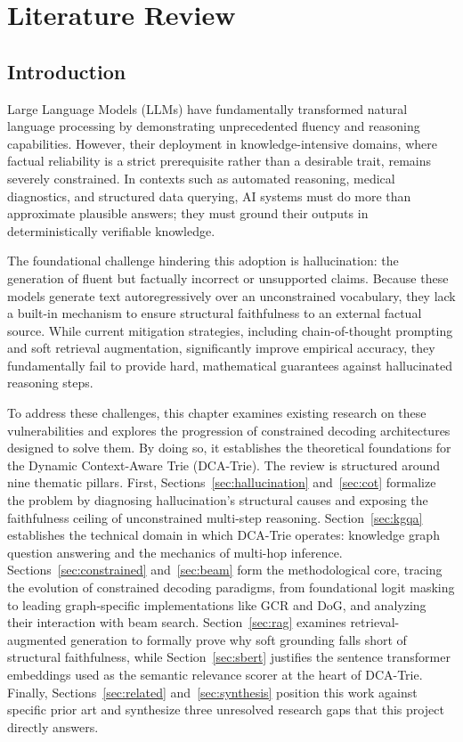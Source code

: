 
\chapter{Literature Review}
\section{Introduction}

Large Language Models (LLMs) have fundamentally transformed natural language processing by demonstrating unprecedented fluency and reasoning capabilities. However, their deployment in knowledge-intensive domains, where factual reliability is a strict prerequisite rather than a desirable trait, remains severely constrained. In contexts such as automated reasoning, medical diagnostics, and structured data querying, AI systems must do more than approximate plausible answers; they must ground their outputs in deterministically verifiable knowledge.

The foundational challenge hindering this adoption is hallucination: the generation of fluent but factually incorrect or unsupported claims. Because these models generate text autoregressively over an unconstrained vocabulary, they lack a built-in mechanism to ensure structural faithfulness to an external factual source. While current mitigation strategies, including chain-of-thought prompting and soft retrieval augmentation, significantly improve empirical accuracy, they fundamentally fail to provide hard, mathematical guarantees against hallucinated reasoning steps.

To address these challenges, this chapter examines existing research on these vulnerabilities and explores the progression of constrained decoding architectures designed to solve them. By doing so, it establishes the theoretical foundations for the Dynamic Context-Aware Trie (DCA-Trie). The review is structured around nine thematic pillars. First, Sections~\ref{sec:hallucination} and~\ref{sec:cot} formalize the problem by diagnosing hallucination's structural causes and exposing the faithfulness ceiling of unconstrained multi-step reasoning. Section~\ref{sec:kgqa} establishes the technical domain in which DCA-Trie operates: knowledge graph question answering and the mechanics of multi-hop inference. Sections~\ref{sec:constrained} and~\ref{sec:beam} form the methodological core, tracing the evolution of constrained decoding paradigms, from foundational logit masking to leading graph-specific implementations like GCR and DoG, and analyzing their interaction with beam search. Section~\ref{sec:rag} examines retrieval-augmented generation to formally prove why soft grounding falls short of structural faithfulness, while Section~\ref{sec:sbert} justifies the sentence transformer embeddings used as the semantic relevance scorer at the heart of DCA-Trie. Finally, Sections~\ref{sec:related} and~\ref{sec:synthesis} position this work against specific prior art and synthesize three unresolved research gaps that this project directly answers.

